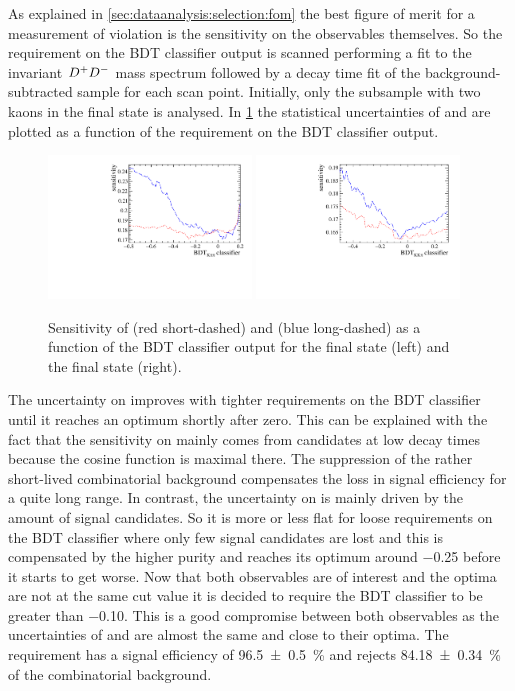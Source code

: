 As explained in \cref{sec:dataanalysis:selection:fom} the best figure of merit
for a measurement of \CP violation is the sensitivity on the \CP observables
themselves. So the requirement on the BDT classifier output is scanned
performing a fit to the invariant ${{D}^+}{{D}^-}$ mass spectrum followed by a decay
time fit of the background-subtracted sample for each scan point. Initially,
only the subsample with two kaons in the \Bd final state is analysed. In
\cref{fig:b02dd:selection:mva:sensitivities} the statistical
uncertainties of \SDD and \CDD are plotted as a function of the requirement on
the BDT classifier output.
%
\begin{figure}[!htb]
\centering
\includegraphics[width=0.48\textwidth]{07-B02DD/figs/Sensitivities_Kpipi.pdf}
\includegraphics[width=0.48\textwidth]{07-B02DD/figs/Sensitivities_KKpi.pdf}
\caption{Sensitivity of \SDD (red short-dashed) and \CDD (blue long-dashed) as
a function of the BDT classifier output for the \KpipiKpipi final state (left)
and the \KKpiKpipi final state (right).}
\label{fig:b02dd:selection:mva:sensitivities}
\end{figure}
%
The uncertainty on \CDD improves with tighter requirements on the BDT
classifier until it reaches an optimum shortly after zero. This can be
explained with the fact that the sensitivity on \CDD mainly comes from
candidates at low decay times because the cosine function is maximal there.
The suppression of the rather short-lived combinatorial background compensates
the loss in signal efficiency for a quite long range. In contrast, the
uncertainty on \SDD is mainly driven by the amount of signal candidates. So it
is more or less flat for loose requirements on the BDT classifier where only
few signal candidates are lost and this is compensated by the higher purity
and reaches its optimum around \num{-0.25} before it starts to get worse. Now
that both observables are of interest and the optima are not at the same cut
value it is decided to require the BDT classifier to be greater than
\num{-0.10}. This is a good compromise between both observables as the
uncertainties of \SDD and \CDD are almost the same and close to their optima.
The requirement has a signal efficiency of \SI{96.5\pm0.5}{\percent} and
rejects \SI{84.18\pm0.34}{\percent} of the combinatorial background.

